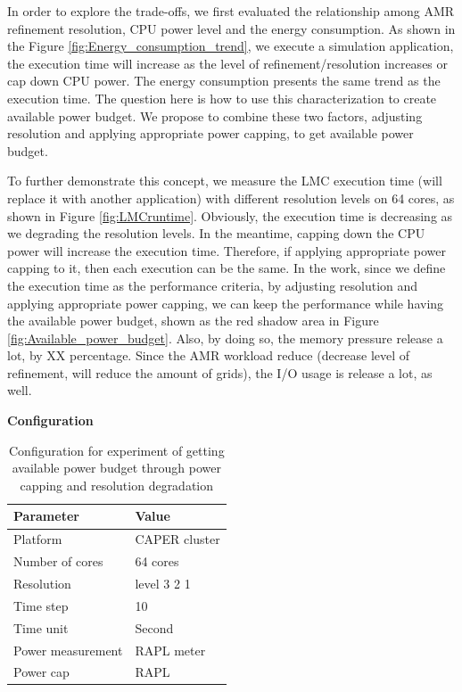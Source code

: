In order to explore the trade-offs, we first evaluated the relationship among AMR refinement resolution, CPU power level and the energy consumption. As shown in the Figure \ref{fig:Energy_consumption_trend}, we execute a simulation application, the execution time will increase as the level of refinement/resolution increases or cap down CPU power. The energy consumption presents the same trend as the execution time. The question here is how to use this characterization to create available power budget. We propose to combine these two factors, adjusting resolution and applying appropriate power capping, to get available power budget.

To further demonstrate this concept, we measure the LMC execution time (will replace it with another application) with different resolution levels on 64 cores, as shown in Figure \ref{fig:LMCruntime}. Obviously, the execution time is decreasing as we degrading the resolution levels. In the meantime, capping down the CPU power will increase the execution time. Therefore, if applying appropriate power capping to it, then each execution can be the same. In the work, since we define the execution time as the performance criteria, by adjusting resolution and applying appropriate power capping, we can keep the performance while having the available power budget, shown as the red shadow area in Figure \ref{fig:Available_power_budget}.
Also, by doing so, the memory pressure release a lot, by XX percentage. Since the AMR workload reduce (decrease level of refinement, will reduce the amount of grids), the I/O usage is release a lot, as well. 
























\textbf{Configuration}
\begin{table}[H]
\begin{center}
\begin{tabular}{|l|l|}
	\hline
	\textbf{Parameter} & \textbf{Value}\\ \hline
    Platform & CAPER cluster\\ 		\hline
    Number of cores & 64 cores\\
	\hline
	Resolution & level 3 2 1\\
    \hline
    Time step & 10\\
    \hline
    Time unit & Second\\
    \hline
    Power measurement & RAPL meter\\
    \hline
    Power cap & RAPL\\
    \hline
\end{tabular}
\end{center}
\caption{Configuration for experiment of getting available power budget through power capping and resolution degradation
}
\label{table:table_tradeoff}
\end{table}



